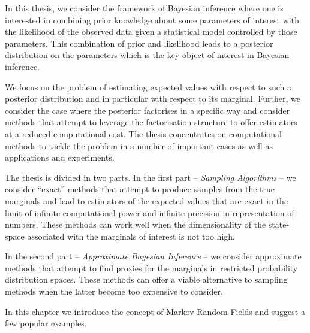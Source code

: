 
In this thesis, we consider the framework of Bayesian inference where one is interested in combining prior knowledge about some parameters of interest with the likelihood of the observed data given a statistical model controlled by those parameters. This combination of prior and likelihood leads to a posterior distribution on the parameters which is the key object of interest in Bayesian inference. 

We focus on the problem of estimating expected values with respect to such a posterior distribution and in particular with respect to its marginal. Further, we consider the case where the posterior factorises in a specific way and consider methods that attempt to leverage the factorisation structure to offer estimators at a reduced computational cost. The thesis concentrates on computational methods to tackle the problem in a number of important cases as well as applications and experiments. 

The thesis is divided in two parts. In the first part -- \emph{Sampling Algorithms} -- we consider ``exact'' methods that attempt to produce samples from the true marginals and lead to estimators of the expected values that are exact in the limit of infinite computational power and infinite precision in representation of numbers. These methods can work well when the dimensionality of the state-space associated with the marginals of interest is not too high. 

In the second part -- \emph{Approximate Bayesian Inference} -- we consider approximate methods that attempt to find proxies for the marginals in restricted probability distribution spaces. These methods can offer a viable alternative to sampling methods when the latter become too expensive to consider. 

In this chapter we introduce the concept of Markov Random Fields and suggest a few popular examples.

